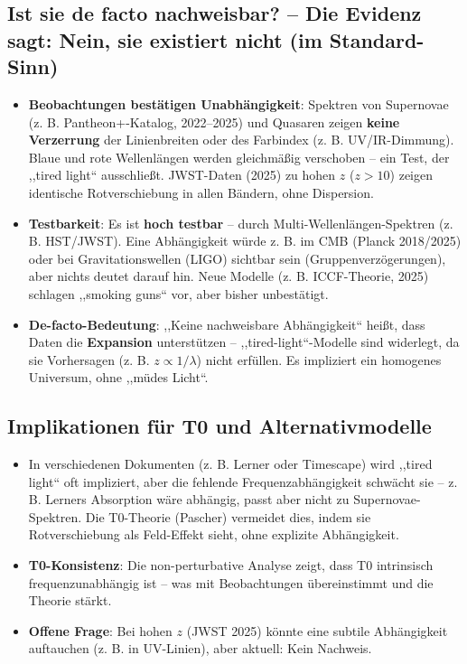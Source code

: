	\subsection{Ist sie de facto nachweisbar? – Die Evidenz sagt: Nein, sie existiert nicht (im Standard-Sinn)}
	
	\begin{itemize}
		\item \textbf{Beobachtungen bestätigen Unabhängigkeit}: Spektren von Supernovae (z. B. Pantheon+-Katalog, 2022–2025) und Quasaren zeigen \textbf{keine Verzerrung} der Linienbreiten oder des Farbindex (z. B. UV/IR-Dimmung). Blaue und rote Wellenlängen werden gleichmäßig verschoben – ein Test, der ,,tired light`` ausschließt. JWST-Daten (2025) zu hohen $z$ ($z>10$) zeigen identische Rotverschiebung in allen Bändern, ohne Dispersion.
		\item \textbf{Testbarkeit}: Es ist \textbf{hoch testbar} – durch Multi-Wellenlängen-Spektren (z. B. HST/JWST). Eine Abhängigkeit würde z. B. im CMB (Planck 2018/2025) oder bei Gravitationswellen (LIGO) sichtbar sein (Gruppenverzögerungen), aber nichts deutet darauf hin. Neue Modelle (z. B. ICCF-Theorie, 2025) schlagen ,,smoking guns`` vor, aber bisher unbestätigt.
		\item \textbf{De-facto-Bedeutung}: ,,Keine nachweisbare Abhängigkeit`` heißt, dass Daten die \textbf{Expansion} unterstützen – ,,tired-light``-Modelle sind widerlegt, da sie Vorhersagen (z. B. $z \propto 1/\lambda$) nicht erfüllen. Es impliziert ein homogenes Universum, ohne ,,müdes Licht``.
	\end{itemize}
	
	\subsection{Implikationen für T0 und Alternativmodelle}
	
	\begin{itemize}
		\item In verschiedenen Dokumenten (z. B. Lerner oder Timescape) wird ,,tired light`` oft impliziert, aber die fehlende Frequenzabhängigkeit schwächt sie – z. B. Lerners Absorption wäre abhängig, passt aber nicht zu Supernovae-Spektren. Die T0-Theorie (Pascher) vermeidet dies, indem sie Rotverschiebung als Feld-Effekt sieht, ohne explizite Abhängigkeit.
		\item \textbf{T0-Konsistenz}: Die non-perturbative Analyse zeigt, dass T0 intrinsisch frequenzunabhängig ist – was mit Beobachtungen übereinstimmt und die Theorie stärkt.
		\item \textbf{Offene Frage}: Bei hohen $z$ (JWST 2025) könnte eine subtile Abhängigkeit auftauchen (z. B. in UV-Linien), aber aktuell: Kein Nachweis.
	\end{itemize}
	
